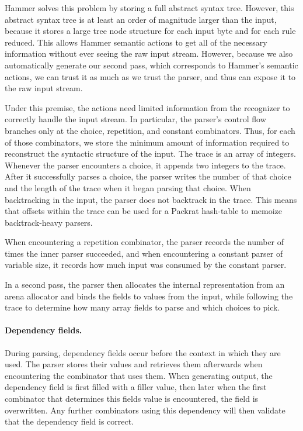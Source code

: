 Hammer solves this problem by storing a full abstract syntax tree. However, this
abstract syntax tree is at least an order of magnitude larger than the input,
because it stores a large tree node structure for each input byte and for each
rule reduced. This allows Hammer semantic actions to get all of the necessary
information without ever seeing the raw input stream. However, because we also
automatically generate our second pass, which corresponds to Hammer's semantic
actions, we can trust it as much as we trust the parser, and thus can expose it
to the raw input stream.

Under this premise, the actions need limited information from the
recognizer to correctly handle the input stream. In particular, the parser's
control flow branches only at the choice, repetition, and constant combinators.
Thus, for each of those combinators, we store the minimum amount of information
required to reconstruct the syntactic structure of the input. The trace is an
array of integers.
Whenever the parser encounters a choice, it appends two integers to the trace. After it
successfully parses a choice, the parser writes the number of that choice and
the length of the trace when it began parsing that choice. When backtracking in
the input, the parser does not backtrack in the trace. This means that offsets
within the trace can be used for a Packrat hash-table to memoize backtrack-heavy
parsers.

When encountering a repetition combinator, the parser records the number of
times the inner parser succeeded, and when encountering a constant parser of
variable size, it records how much input was consumed by the constant parser. 

In a second pass, the parser then allocates the internal representation from an
arena allocator and binds the fields to values from the input, while following
the trace to determine how many array fields to parse and which choices to pick.

\paragraph{Dependency fields.}

During parsing, dependency fields occur before the context in which they are
used. The parser stores their values and retrieves them afterwards when
encountering the combinator that uses them. When generating output, the
dependency field is first filled with a filler value, then later when the first
combinator that determines this fields value is encountered, the field is
overwritten. Any further combinators using this dependency will then validate
that the dependency field is correct.

